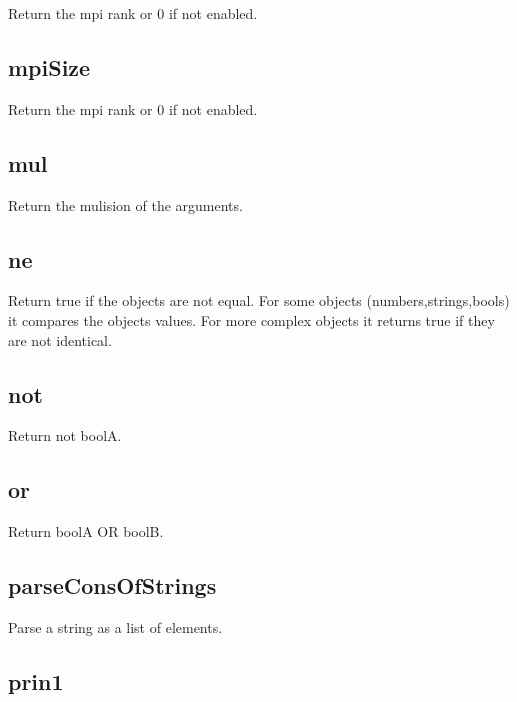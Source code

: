 \begin{itemize}
  Return the mpi rank or 0 if not enabled.

\subsection{mpiSize}

  Return the mpi rank or 0 if not enabled.

\subsection{mul}
  \par

  Return the mulision of the arguments.

\subsection{ne}
  \par

  Return true if the objects are not equal. For some objects (numbers,strings,bools) it compares the objects values. For more complex objects it returns true if they are not identical.

\subsection{not}
  \par

  Return not boolA.

\subsection{or}
  \par

  Return boolA OR boolB.

\subsection{parseConsOfStrings}

  Parse a string as a list of elements.

\subsection{prin1}
  \par


\end{itemize}
